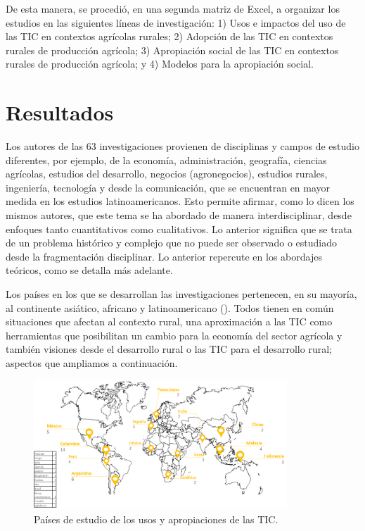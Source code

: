 \documentclass[spanish]{textolivre}
\begin{document}
De esta manera, se procedió, en una segunda matriz de Excel, a organizar los estudios en las siguientes líneas de investigación: 1) Usos e impactos del uso de las TIC en contextos agrícolas rurales; 2) Adopción de las TIC en contextos rurales de producción agrícola; 3) Apropiación social de las TIC en contextos rurales de producción agrícola; y 4) Modelos para la apropiación social.

\section{Resultados}\label{sec-organizacao}

Los autores de las 63 investigaciones provienen de disciplinas y campos de estudio diferentes, por ejemplo, de la economía, administración, geografía, ciencias agrícolas, estudios del desarrollo, negocios (agronegocios), estudios rurales, ingeniería, tecnología y desde la comunicación, que se encuentran en mayor medida en los estudios latinoamericanos. Esto permite afirmar, como lo dicen los mismos autores, que este tema se ha abordado de manera interdisciplinar, desde enfoques tanto cuantitativos como cualitativos. Lo anterior significa que se trata de un problema histórico y complejo que no puede ser observado o estudiado desde la fragmentación disciplinar. Lo anterior repercute en los abordajes teóricos, como se detalla más adelante. 

Los países en los que se desarrollan las investigaciones pertenecen, en su mayoría, al continente asiático, africano y latinoamericano (). Todos tienen en común situaciones que afectan al contexto rural, una aproximación a las TIC como herramientas que posibilitan un cambio para la economía del sector agrícola y también visiones desde el desarrollo rural o las TIC para el desarrollo rural; aspectos que ampliamos a continuación. 

\begin{figure}[htbp]
\centering
\includegraphics[width=0.85\textwidth]{fig1.png}
\caption{Países de estudio de los usos y apropiaciones de las TIC.}
\label{fig1}
\end{figure}
\end{document}
